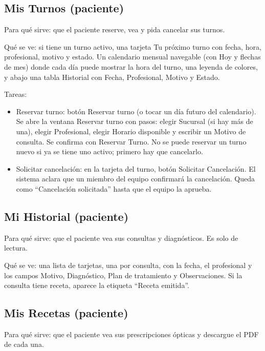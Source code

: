 \subsection{Mis Turnos (paciente)}
\label{sec:mu-mis-turnos}

Para qué sirve: que el paciente reserve, vea y pida cancelar sus turnos.

Qué se ve: si tiene un turno activo, una tarjeta Tu próximo turno con fecha, hora, profesional, motivo y estado. Un calendario mensual navegable (con Hoy y flechas de mes) donde cada día puede mostrar la hora del turno, una leyenda de colores, y abajo una tabla Historial con Fecha, Profesional, Motivo y Estado.

Tareas:
\begin{itemize}
  \item Reservar turno: botón Reservar turno (o tocar un día futuro del calendario). Se abre la ventana Reservar turno con pasos: elegir Sucursal (si hay más de una), elegir Profesional, elegir Horario disponible y escribir un Motivo de consulta. Se confirma con Reservar Turno. No se puede reservar un turno nuevo si ya se tiene uno activo; primero hay que cancelarlo.
  \item Solicitar cancelación: en la tarjeta del turno, botón Solicitar Cancelación. El sistema aclara que un miembro del equipo confirmará la cancelación. Queda como ``Cancelación solicitada'' hasta que el equipo la aprueba.
\end{itemize}

\subsection{Mi Historial (paciente)}
\label{sec:mu-mi-historial}

Para qué sirve: que el paciente vea sus consultas y diagnósticos. Es solo de lectura.

Qué se ve: una lista de tarjetas, una por consulta, con la fecha, el profesional y los campos Motivo, Diagnóstico, Plan de tratamiento y Observaciones. Si la consulta tiene receta, aparece la etiqueta ``Receta emitida''.

\subsection{Mis Recetas (paciente)}
\label{sec:mu-mis-recetas}

Para qué sirve: que el paciente vea sus prescripciones ópticas y descargue el PDF de cada una.

